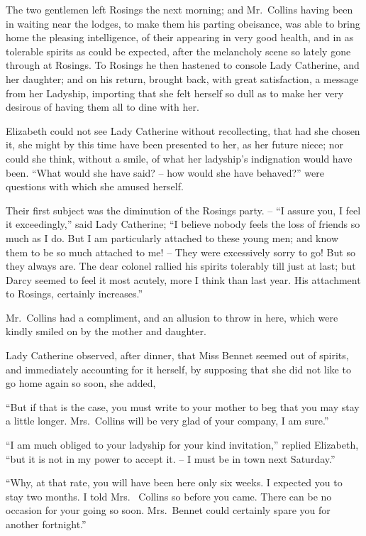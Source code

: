 
The two gentlemen left Rosings the next morning;
and Mr.\ Collins having been in waiting near the lodges,
to make them his parting obeisance, was able to bring
home the pleasing intelligence, of their appearing in very
good health, and in as tolerable spirits as could be
expected, after the melancholy scene so lately gone
through at Rosings. To Rosings he then hastened to
console Lady Catherine, and her daughter; and on his
return, brought back, with great satisfaction, a message
from her Ladyship, importing that she felt herself so
dull as to make her very desirous of having them all to
dine with her.

Elizabeth could not see Lady Catherine without recollecting,
that had she chosen it, she might by this time
have been presented to her, as her future niece; nor
could she think, without a smile, of what her ladyship’s
indignation would have been. “What would she have
said? -- how would she have behaved?” were questions
with which she amused herself.

Their first subject was the diminution of the Rosings
party. -- “I assure you, I feel it exceedingly,” said Lady
Catherine; “I believe nobody feels the loss of friends so
much as I do. But I am particularly attached to these
young men; and know them to be so much attached to
me! -- They were excessively sorry to go! But so they
always are. The dear colonel rallied his spirits tolerably
till just at last; but Darcy seemed to feel it most acutely,
more I think than last year. His attachment to Rosings,
certainly increases.”

Mr.\ Collins had a compliment, and an allusion to throw
in here, which were kindly smiled on by the mother and
daughter.

Lady Catherine observed, after dinner, that Miss
Bennet seemed out of spirits, and immediately accounting
for it herself, by supposing that she did not like to
go home again so soon, she added,

“But if that is the case, you must write to your mother
to beg that you may stay a little longer. Mrs.\ Collins
will be very glad of your company, I am sure.”

“I am much obliged to your ladyship for your kind
invitation,” replied Elizabeth, “but it is not in my power
to accept it. -- I must be in town next Saturday.”

“Why, at that rate, you will have been here only six
weeks. I expected you to stay two months. I told Mrs.\ %
Collins so before you came. There can be no occasion
for your going so soon. Mrs.\ Bennet could certainly spare
you for another fortnight.”

